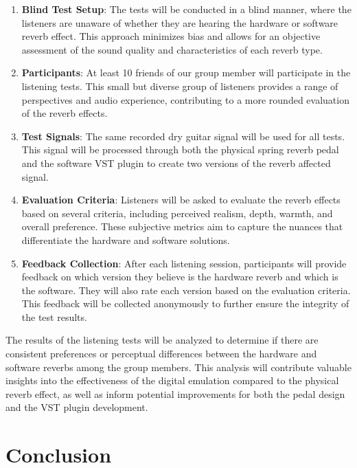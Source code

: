 \documentclass[12pt]{article}
\begin{document}
\begin{enumerate}
    \item \textbf{Blind Test Setup}: The tests will be conducted in a blind manner, where the listeners are unaware of whether they are hearing the hardware or software reverb effect. This approach minimizes bias and allows for an objective assessment of the sound quality and characteristics of each reverb type.
    
    \item \textbf{Participants}: At least 10 friends of our group member will participate in the listening tests. This small but diverse group of listeners provides a range of perspectives and audio experience, contributing to a more rounded evaluation of the reverb effects.
    
    \item \textbf{Test Signals}: The same recorded dry guitar signal will be used for all tests. This signal will be processed through both the physical spring reverb pedal and the software VST plugin to create two versions of the reverb affected signal.
    
    \item \textbf{Evaluation Criteria}: Listeners will be asked to evaluate the reverb effects based on several criteria, including perceived realism, depth, warmth, and overall preference. These subjective metrics aim to capture the nuances that differentiate the hardware and software solutions.
    
    \item \textbf{Feedback Collection}: After each listening session, participants will provide feedback on which version they believe is the hardware reverb and which is the software. They will also rate each version based on the evaluation criteria. This feedback will be collected anonymously to further ensure the integrity of the test results.
\end{enumerate}

The results of the listening tests will be analyzed to determine if there are consistent preferences or perceptual differences between the hardware and software reverbs among the group members. This analysis will contribute valuable insights into the effectiveness of the digital emulation compared to the physical reverb effect, as well as inform potential improvements for both the pedal design and the VST plugin development.

\section{Conclusion}
\end{document}
